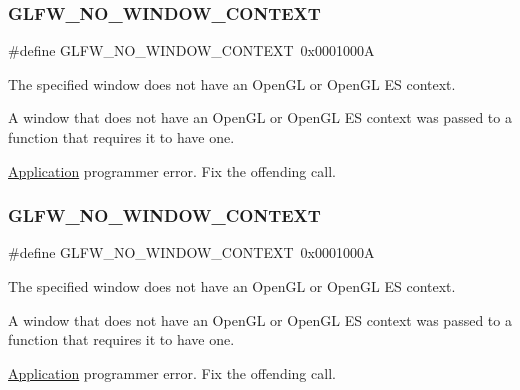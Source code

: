 \subsubsection{\texorpdfstring{G\+L\+F\+W\+\_\+\+N\+O\+\_\+\+W\+I\+N\+D\+O\+W\+\_\+\+C\+O\+N\+T\+E\+XT}{GLFW\_NO\_WINDOW\_CONTEXT}\hspace{0.1cm}{\footnotesize\ttfamily [3/5]}}
{\footnotesize\ttfamily \#define G\+L\+F\+W\+\_\+\+N\+O\+\_\+\+W\+I\+N\+D\+O\+W\+\_\+\+C\+O\+N\+T\+E\+XT~0x0001000A}



The specified window does not have an Open\+GL or Open\+GL ES context. 

A window that does not have an Open\+GL or Open\+GL ES context was passed to a function that requires it to have one.

\hyperlink{classApplication}{Application} programmer error. Fix the offending call. \mbox{\label{group__errors_gacff24d2757da752ae4c80bf452356487}} 
\subsubsection{\texorpdfstring{G\+L\+F\+W\+\_\+\+N\+O\+\_\+\+W\+I\+N\+D\+O\+W\+\_\+\+C\+O\+N\+T\+E\+XT}{GLFW\_NO\_WINDOW\_CONTEXT}\hspace{0.1cm}{\footnotesize\ttfamily [4/5]}}
{\footnotesize\ttfamily \#define G\+L\+F\+W\+\_\+\+N\+O\+\_\+\+W\+I\+N\+D\+O\+W\+\_\+\+C\+O\+N\+T\+E\+XT~0x0001000A}



The specified window does not have an Open\+GL or Open\+GL ES context. 

A window that does not have an Open\+GL or Open\+GL ES context was passed to a function that requires it to have one.

\hyperlink{classApplication}{Application} programmer error. Fix the offending call. \mbox{\label{group__errors_gacff24d2757da752ae4c80bf452356487}} 
